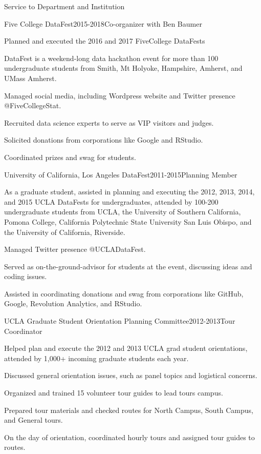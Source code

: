 \documentclass{resume} %
\begin{document}
\begin{rSection}{Service to Department and Institution}
\begin{rSubsection}{Five College DataFest}{}{2015-2018}{Co-organizer with Ben Baumer }
\item Planned and executed the 2016 and 2017 FiveCollege DataFests
\item DataFest is a weekend-long data hackathon event for more than 100 undergraduate students from Smith, Mt Holyoke, Hampshire, Amherst, and UMass Amherst. 
\item Managed social media, including Wordpress website and Twitter presence @FiveCollegeStat. 
\item Recruited data science experts to serve as VIP visitors and judges. 
\item Solicited donations from corporations like Google and RStudio. 
\item Coordinated prizes and swag for students. 
\end{rSubsection}


\begin{rSubsection}{University of California, Los Angeles DataFest}{}{2011-2015}{Planning Member}
\item As a graduate student, assisted in planning and executing the 2012, 2013, 2014, and 2015 UCLA DataFests for undergraduates, attended by 100-200 undergraduate students from UCLA, the University of Southern California, Pomona College, California Polytechnic State University San Luis Obispo, and the University of California, Riverside. 
\item Managed Twitter presence @UCLADataFest. 
\item Served as on-the-ground-advisor for students at the event, discussing ideas and coding issues. 
\item Assisted in coordinating donations and swag from corporations like GitHub, Google, Revolution Analytics, and RStudio. 
\end{rSubsection}

\begin{rSubsection}{UCLA Graduate Student Orientation Planning Committee}{}{2012-2013}{Tour Coordinator}
\item Helped plan and execute the 2012 and 2013 UCLA grad student orientations, attended by 1,000+ incoming graduate students each year. 
\item Discussed general orientation issues, such as panel topics and logistical concerns.
\item Organized and trained 15 volunteer tour guides to lead tours campus.
\item Prepared tour materials and checked routes for North Campus, South Campus, and General tours.
\item On the day of orientation, coordinated hourly tours and assigned tour guides to routes.
\end{rSubsection}


\end{rSection}
\end{document}
